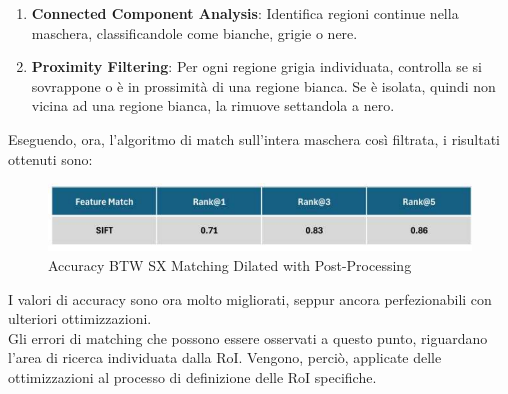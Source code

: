 \documentclass[12pt,a4paper,openright,twoside]{book}
\begin{document}
\begin{itemize}
\begin{enumerate}
\item \textbf{Connected Component Analysis}: Identifica regioni continue nella maschera, classificandole come bianche, grigie o nere.
\item \textbf{Proximity Filtering}: Per ogni regione grigia individuata, controlla se si sovrappone o è in prossimità di una regione bianca. Se è isolata, quindi non vicina ad una regione bianca, la rimuove settandola a nero.
\end{enumerate}
\begin{figure}[H]
    \centering
    
\end{figure}

\end{itemize}

Eseguendo, ora, l'algoritmo di match sull'intera maschera così filtrata, i risultati ottenuti sono:
\begin{figure}[H]
	\centering
	\includegraphics{figures/sx7.pdf}
    	\caption{Accuracy BTW SX Matching Dilated with Post-Processing}
	\label{fig:sx6}
\end{figure}

I valori di accuracy sono ora molto migliorati, seppur ancora perfezionabili con ulteriori ottimizzazioni. \\
Gli errori di matching che possono essere osservati a questo punto, riguardano l'area di ricerca individuata dalla RoI. Vengono, perciò, applicate delle ottimizzazioni al processo di definizione delle RoI specifiche.

\end{document}
